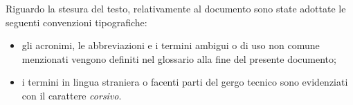 \noindent Riguardo la stesura del testo, relativamente al documento sono state adottate le seguenti convenzioni tipografiche:
\begin{itemize}
	\item gli acronimi, le abbreviazioni e i termini ambigui o di uso non comune menzionati vengono definiti nel glossario alla fine del presente documento;
	\item i termini in lingua straniera o facenti parti del gergo tecnico sono evidenziati con il carattere \emph{corsivo}.
\end{itemize}